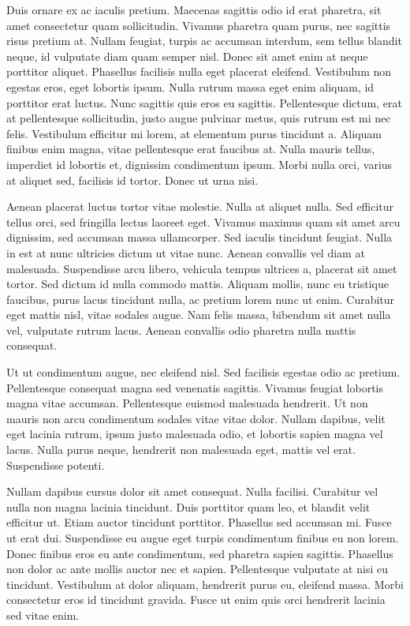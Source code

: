 \documentclass[
  a4paper,
  DIV=11,
  numbers=noendperiod]{scrreprt}
\begin{document}
Duis ornare ex ac iaculis pretium. Maecenas sagittis odio id erat
pharetra, sit amet consectetur quam sollicitudin. Vivamus pharetra quam
purus, nec sagittis risus pretium at. Nullam feugiat, turpis ac accumsan
interdum, sem tellus blandit neque, id vulputate diam quam semper nisl.
Donec sit amet enim at neque porttitor aliquet. Phasellus facilisis
nulla eget placerat eleifend. Vestibulum non egestas eros, eget lobortis
ipsum. Nulla rutrum massa eget enim aliquam, id porttitor erat luctus.
Nunc sagittis quis eros eu sagittis. Pellentesque dictum, erat at
pellentesque sollicitudin, justo augue pulvinar metus, quis rutrum est
mi nec felis. Vestibulum efficitur mi lorem, at elementum purus
tincidunt a. Aliquam finibus enim magna, vitae pellentesque erat
faucibus at. Nulla mauris tellus, imperdiet id lobortis et, dignissim
condimentum ipsum. Morbi nulla orci, varius at aliquet sed, facilisis id
tortor. Donec ut urna nisi.

Aenean placerat luctus tortor vitae molestie. Nulla at aliquet nulla.
Sed efficitur tellus orci, sed fringilla lectus laoreet eget. Vivamus
maximus quam sit amet arcu dignissim, sed accumsan massa ullamcorper.
Sed iaculis tincidunt feugiat. Nulla in est at nunc ultricies dictum ut
vitae nunc. Aenean convallis vel diam at malesuada. Suspendisse arcu
libero, vehicula tempus ultrices a, placerat sit amet tortor. Sed dictum
id nulla commodo mattis. Aliquam mollis, nunc eu tristique faucibus,
purus lacus tincidunt nulla, ac pretium lorem nunc ut enim. Curabitur
eget mattis nisl, vitae sodales augue. Nam felis massa, bibendum sit
amet nulla vel, vulputate rutrum lacus. Aenean convallis odio pharetra
nulla mattis consequat.

Ut ut condimentum augue, nec eleifend nisl. Sed facilisis egestas odio
ac pretium. Pellentesque consequat magna sed venenatis sagittis. Vivamus
feugiat lobortis magna vitae accumsan. Pellentesque euismod malesuada
hendrerit. Ut non mauris non arcu condimentum sodales vitae vitae dolor.
Nullam dapibus, velit eget lacinia rutrum, ipsum justo malesuada odio,
et lobortis sapien magna vel lacus. Nulla purus neque, hendrerit non
malesuada eget, mattis vel erat. Suspendisse potenti.

Nullam dapibus cursus dolor sit amet consequat. Nulla facilisi.
Curabitur vel nulla non magna lacinia tincidunt. Duis porttitor quam
leo, et blandit velit efficitur ut. Etiam auctor tincidunt porttitor.
Phasellus sed accumsan mi. Fusce ut erat dui. Suspendisse eu augue eget
turpis condimentum finibus eu non lorem. Donec finibus eros eu ante
condimentum, sed pharetra sapien sagittis. Phasellus non dolor ac ante
mollis auctor nec et sapien. Pellentesque vulputate at nisi eu
tincidunt. Vestibulum at dolor aliquam, hendrerit purus eu, eleifend
massa. Morbi consectetur eros id tincidunt gravida. Fusce ut enim quis
orci hendrerit lacinia sed vitae enim.


\printbibliography
\end{document}
